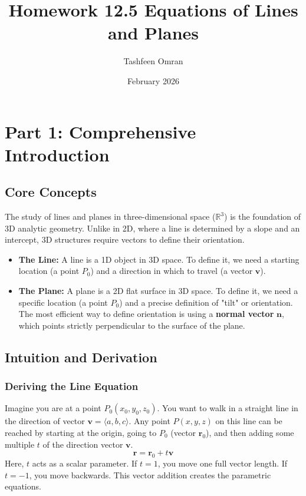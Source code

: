 \documentclass[11pt]{article}
\title{Homework 12.5 Equations of Lines and Planes}
\author{Tashfeen Omran}
\date{February 2026}
\begin{document}
\maketitle
\tableofcontents
\newpage

\section{Part 1: Comprehensive Introduction}

\subsection{Core Concepts}
The study of lines and planes in three-dimensional space ($\mathbb{R}^3$) is the foundation of 3D analytic geometry. Unlike in 2D, where a line is determined by a slope and an intercept, 3D structures require vectors to define their orientation.

\begin{itemize}
    \item \textbf{The Line:} A line is a 1D object in 3D space. To define it, we need a starting location (a point $P_0$) and a direction in which to travel (a vector $\mathbf{v}$).
    \item \textbf{The Plane:} A plane is a 2D flat surface in 3D space. To define it, we need a specific location (a point $P_0$) and a precise definition of "tilt" or orientation. The most efficient way to define orientation is using a \textbf{normal vector} $\mathbf{n}$, which points strictly perpendicular to the surface of the plane.
\end{itemize}

\subsection{Intuition and Derivation}

\subsubsection{Deriving the Line Equation}
Imagine you are at a point $P_0(x_0, y_0, z_0)$. You want to walk in a straight line in the direction of vector $\mathbf{v} = \langle a, b, c \rangle$.
Any point $P(x, y, z)$ on this line can be reached by starting at the origin, going to $P_0$ (vector $\mathbf{r}_0$), and then adding some multiple $t$ of the direction vector $\mathbf{v}$.
\[ \mathbf{r} = \mathbf{r}_0 + t\mathbf{v} \]
Here, $t$ acts as a scalar parameter. If $t=1$, you move one full vector length. If $t=-1$, you move backwards. This vector addition creates the parametric equations.
\end{document}
